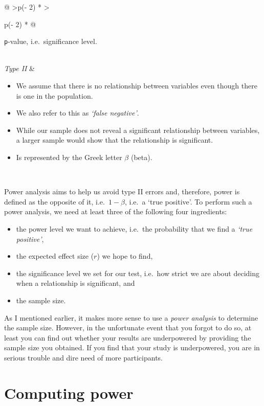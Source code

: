 \documentclass[
  letterpaper,
]{krantz}
\begin{document}
\begin{longtable}[]{@{}
  >{\centering\arraybackslash}p{(\columnwidth - 2\tabcolsep) * }
  >{\raggedright\arraybackslash}p{(\columnwidth - 2\tabcolsep) * }@{}}
\begin{minipage}[t]{\linewidth}
\begin{itemize}
  \texttt{p}-value, i.e.~significance level.
\end{itemize}
\end{minipage} \\
\emph{Type II} & \begin{minipage}[t]{\linewidth}\raggedright
\begin{itemize}
\item
  We assume that there is no relationship between variables even though
  there is one in the population.
\item
  We also refer to this as \emph{`false negative'}.
\item
  While our sample does not reveal a significant relationship between
  variables, a larger sample would show that the relationship is
  significant.
\item
  Is represented by the Greek letter \(\beta\) (beta).
\end{itemize}
\end{minipage} \\
\end{longtable}

Power analysis aims to help us avoid type II errors and, therefore,
power is defined as the opposite of it, i.e.~\(1 - \beta\), i.e.~a `true
positive'. To perform such a power analysis, we need at least three of
the following four ingredients:

\begin{itemize}
\item
  the power level we want to achieve, i.e.~the probability that we find
  a \emph{`true positive'},
\item
  the expected effect size (\(r\)) we hope to find,
\item
  the significance level we set for our test, i.e.~how strict we are
  about deciding when a relationship is significant, and
\item
  the sample size.
\end{itemize}

As I mentioned earlier, it makes more sense to use a \emph{power
analysis} to determine the sample size. However, in the unfortunate
event that you forgot to do so, at least you can find out whether your
results are underpowered by providing the sample size you obtained. If
you find that your study is underpowered, you are in serious trouble and
dire need of more participants.

\section{Computing power}\label{sec-computing-power}
\end{document}
